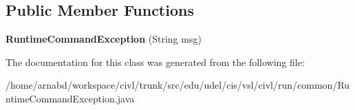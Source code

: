 \subsection*{Public Member Functions}
\begin{DoxyCompactItemize}
\item 
\hypertarget{classedu_1_1udel_1_1cis_1_1vsl_1_1civl_1_1run_1_1common_1_1RuntimeCommandException_a1d7165b679afbe0b9abf756c746dbbe1}{}{\bfseries Runtime\+Command\+Exception} (String msg)\label{classedu_1_1udel_1_1cis_1_1vsl_1_1civl_1_1run_1_1common_1_1RuntimeCommandException_a1d7165b679afbe0b9abf756c746dbbe1}

\end{DoxyCompactItemize}


The documentation for this class was generated from the following file\+:\begin{DoxyCompactItemize}
\item 
/home/arnabd/workspace/civl/trunk/src/edu/udel/cis/vsl/civl/run/common/Runtime\+Command\+Exception.\+java\end{DoxyCompactItemize}
